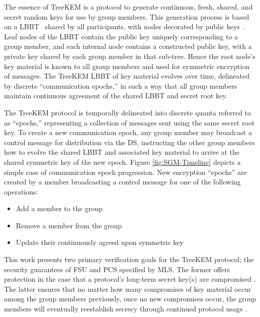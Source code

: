 \documentclass[runningheads]{llncs}
\newcommand{\Abrev}[1]{\gls{#1}}
\begin{document}
The essence of TreeKEM is a protocol to generate continuous, fresh, shared, and secret random keys for use by group members.
This generation process is based on a \Abrev{LBBT}~\cite{baerentzen2003left} shared by all participants, with nodes decorated by public keys~\cite{rfc4949}.
Leaf nodes of the \Abrev{LBBT} contain the public key uniquely corresponding to a group member, and each 
internal node contains a constructed public key, with a private key shared by each group member in that sub-tree.
Hence the root node's key material is known to all group members and used for symmetric encryption of messages.
The TreeKEM \Abrev{LBBT} of key material evolves over time, delineated by discrete ``communication epochs,'' in such a way that all group members maintain continuous agreement of the shared \Abrev{LBBT} and secret root key.

The TreeKEM protocol is temporally delineated into discrete quanta referred to as ``epochs,'' representing a collection of messages sent using the same secret root key.
To create a new communication epoch, any group member may broadcast a control message for distribution via the \Abrev{DS}, instructing the other group members how to evolve the shared \Abrev{LBBT} and associated key material to arrive at the shared symmetric key of the new epoch.
Figure \ref{fig:SGM-Timeline} depicts a simple case of communication epoch progression.
New encryption ``epochs'' are created by a member broadcasting a control message for one of the following operations:

\begin{itemize}
	\item Add a member to the group
	\item Remove a member from the group
	\item Update their continuously agreed upon symmetric key
\end{itemize}

This work presents two primary verification goals for the TreeKEM protocol; the security guarantees of \Abrev{FSU} and  \Abrev{PCS} specified by \Abrev{MLS}.
The former offers protection in the case that a protocol's long-term secret key(s) are compromised \cite{boyd2021modern}.
The latter ensures that no matter how many compromises of key material occur among the group members previously, once no new compromises occur, the group members will eventually reestablish secrecy through continued protocol usage \cite{CohnGordon2016}.\\[-1mm]
\end{document}
